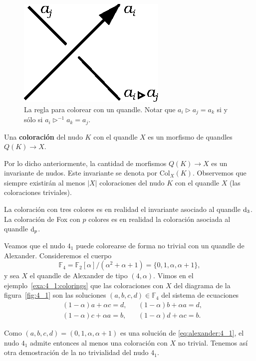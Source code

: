 \documentclass[graybox]{svmult}
\newcommand{\F}{\mathbb{F}}
\begin{document}
    \begin{figure}[h]
		\centering
	    \includegraphics[scale=0.6]{images/quandlecrossing}
		\caption{La regla para colorear con un quandle. Notar que $a_i\triangleright a_j=a_k$ si y sólo si $a_i\triangleright^{-1}a_k=a_j$.}
        \label{fig:quandle_crossing}
    \end{figure}

	\begin{definition}
		Una \textbf{coloración} del nudo $K$ con el quandle $X$ es un morfismo
		de quandles $Q(K)\to X$. 
	\end{definition}

	Por lo dicho anteriormente, la cantidad de
    morfismos $Q(K)\to X$ es un invariante de nudos.  Este invariante se denota
    por $\mathrm{Col}_X(K)$.  Observemos que siempre existirán al menos $|X|$
    coloraciones del nudo $K$ con el quandle $X$ (las coloraciones triviales).

\begin{example}
    La coloración con tres colores es en realidad el invariante asociado al
    quandle $\mathrm{d}_3$. La coloración de Fox con $p$ colores 
    es en realidad la coloración asociada al quandle $\mathrm{d}_p$. 
\end{example}

\begin{example}
    \label{exa:T}
    Veamos que el nudo $4_1$ puede colorearse de forma no trivial con un
    quandle de Alexander.  Consideremos el cuerpo
    \[
        \F_4=\F_2[\alpha]/(\alpha^2+\alpha+1)=\{0,1,\alpha,\alpha+1\},
    \]
    y sea $X$ el quandle de Alexander de tipo $(4,\alpha)$. Vimos en el
    ejemplo~\ref{exa:4_1:colorings} que las coloraciones con $X$ del diagrama de la
    figura~\ref{fig:4_1} son las soluciones $(a,b,c,d)\in\F_4$ del sistema de
    ecuaciones 
    \begin{equation}
        \label{eq:alexander:4_1}
        \begin{aligned}
            & (1-\alpha)a+\alpha c=d, && (1-\alpha)b+\alpha a=d,\\
            & (1-\alpha)c+\alpha a=b, && (1-\alpha)d+\alpha c=b.
        \end{aligned}
    \end{equation}

    Como $(a,b,c,d)=(0,1,\alpha,\alpha+1)$ es una solución de
    \eqref{eq:alexander:4_1}, el nudo $4_1$ admite entonces al menos una coloración 
    con $X$ no trivial.  Tenemos así otra demostración de la no trivialidad del
    nudo $4_1$. 
\end{example}
\end{document}
